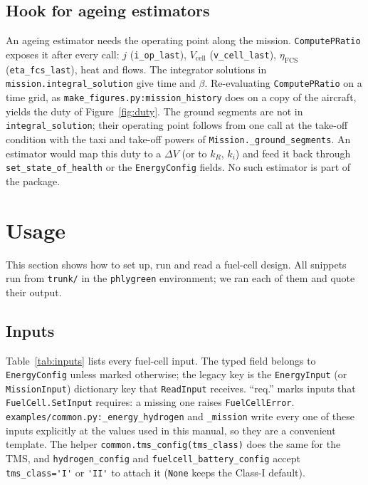 \documentclass[a4paper,11pt]{article}
\newcommand{\code}[1]{\nolinkurl{#1}}
\newcommand{\fn}[1]{\nolinkurl{#1}}
\begin{document}
\subsection{Hook for ageing estimators}

An ageing estimator needs the operating point along the mission. \fn{ComputePRatio} exposes it
after every call: $j$ (\code{i_op_last}), $V_\mathrm{cell}$ (\code{v_cell_last}),
$\eta_\mathrm{FCS}$ (\code{eta_fcs_last}), heat and flows. The integrator solutions in
\code{mission.integral_solution} give time and $\beta$. Re-evaluating \fn{ComputePRatio} on a
time grid, as \fn{make_figures.py:mission_history} does on a copy of the aircraft, yields the
duty of Figure~\ref{fig:duty}. The ground segments are not in \code{integral_solution}; their
operating point follows from one call at the take-off condition with the taxi and take-off
powers of \fn{Mission._ground_segments}. An estimator would map this duty to a $\Delta V$ (or
to $k_R$, $k_i$) and feed it back through \fn{set_state_of_health} or the \code{EnergyConfig}
fields. No such estimator is part of the package.

\section{Usage}
\label{sec:usage}

This section shows how to set up, run and read a fuel-cell design. All snippets run from
\fn{trunk/} in the \code{phlygreen} environment; we ran each of them and quote their output.

\subsection{Inputs}
\label{sec:inputs}

Table~\ref{tab:inputs} lists every fuel-cell input. The typed field belongs to
\code{EnergyConfig} unless marked otherwise; the legacy key is the \code{EnergyInput} (or
\code{MissionInput}) dictionary key that \code{ReadInput} receives. ``req.'' marks inputs that
\fn{FuelCell.SetInput} requires: a missing one raises \code{FuelCellError}.
\fn{examples/common.py:_energy_hydrogen} and \fn{_mission} write every one of these inputs
explicitly at the values used in this manual, so they are a convenient template. The helper
\fn{common.tms_config(tms_class)} does the same for the TMS, and \fn{hydrogen_config} and
\fn{fuelcell_battery_config} accept \code{tms_class='I'} or \code{'II'} to attach it
(\code{None} keeps the Class-I default).
\end{document}
